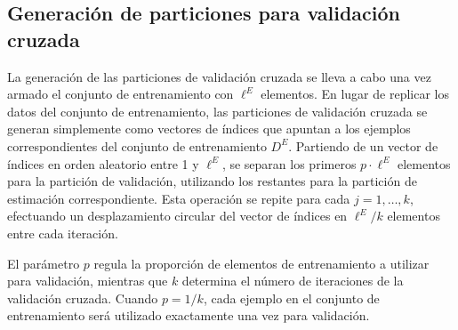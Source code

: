 %
%
\subsection{Generación de particiones para validación cruzada}
%
La generación de las particiones de validación cruzada se lleva a cabo
una vez armado el conjunto de entrenamiento con $\ell^E$ elementos.
En lugar de replicar los datos del conjunto de entrenamiento, las
particiones de validación cruzada se generan simplemente como vectores
de índices que apuntan a los ejemplos correspondientes del conjunto de
entrenamiento $D^E$.  Partiendo de un vector de índices en orden
aleatorio entre 1 y $\ell^E$, se separan los primeros $p\cdot\ell^E$
elementos para la partición de validación, utilizando los restantes
para la partición de estimación correspondiente. Esta operación se
repite para cada $j=1,\ldots,k$, efectuando un desplazamiento circular
del vector de índices en $\ell^E/k$ elementos entre cada iteración.

El parámetro $p$ regula la proporción de elementos de entrenamiento a
utilizar para validación, mientras que $k$ determina el número de
iteraciones de la validación cruzada. Cuando $p=1/k$, cada ejemplo en
el conjunto de entrenamiento será utilizado exactamente una vez para
validación.
